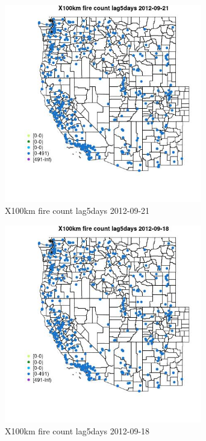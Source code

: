 \begin{figure} 
\centering  
\includegraphics[width=0.77\textwidth]{Code_Outputs/Report_ML_input_PM25_Step4_part_e_de_duplicated_aves_compiled_2019-05-14wNAs_MapObsX100km_fire_count_lag5days2012-09-21.jpg} 
\caption{\label{fig:Report_ML_input_PM25_Step4_part_e_de_duplicated_aves_compiled_2019-05-14wNAsMapObsX100km_fire_count_lag5days2012-09-21}X100km fire count lag5days 2012-09-21} 
\end{figure} 
 

\begin{figure} 
\centering  
\includegraphics[width=0.77\textwidth]{Code_Outputs/Report_ML_input_PM25_Step4_part_e_de_duplicated_aves_compiled_2019-05-14wNAs_MapObsX100km_fire_count_lag5days2012-09-18.jpg} 
\caption{\label{fig:Report_ML_input_PM25_Step4_part_e_de_duplicated_aves_compiled_2019-05-14wNAsMapObsX100km_fire_count_lag5days2012-09-18}X100km fire count lag5days 2012-09-18} 
\end{figure} 
 

